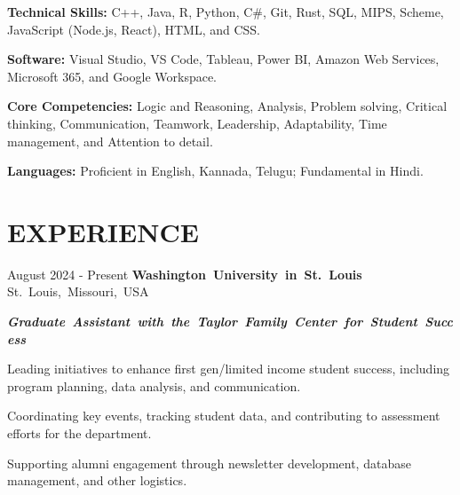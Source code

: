 \documentclass[10pt, letterpaper]{article}
\begin{document}
\begin{onecolentry}
    \textbf{Technical Skills:} C++, Java, R, Python, C\#, Git, Rust, SQL, MIPS, Scheme, JavaScript (Node.js, React), HTML, and CSS.
\end{onecolentry}
\vspace{\highlightSpacing}
\begin{onecolentry}
    \textbf{Software:} Visual Studio, VS Code, Tableau, Power BI, Amazon Web Services, Microsoft 365, and Google Workspace.
\end{onecolentry}
\vspace{\highlightSpacing}
\begin{onecolentry}
    \textbf{Core Competencies:} Logic and Reasoning, Analysis, Problem solving, Critical thinking, Communication, Teamwork, Leadership, Adaptability, Time management, and Attention to detail.
\end{onecolentry}
\vspace{\highlightSpacing}
\begin{onecolentry}
    \textbf{Languages:} Proficient in English, Kannada, Telugu; Fundamental in Hindi.
\end{onecolentry}

\section{EXPERIENCE}

\begin{twocolentry}{August 2024 - Present}
    \mbox{\textbf{Washington University in St. Louis}}
    \kern {}
    \AND
    \kern {}
    \mbox{St. Louis, Missouri, USA}
\end{twocolentry}

\vspace{\highlightSpacing}
\mbox{\textit{\textbf{Graduate Assistant with the Taylor Family Center for Student Success}}}
\begin{onecolentry}
    \begin{highlightsforbulletentries}
        \item Leading initiatives to enhance first gen/limited income student success, including program planning, data analysis, and communication.
        \item Coordinating key events, tracking student data, and contributing to assessment efforts for the department.
        \item Supporting alumni engagement through newsletter development, database management, and other logistics.
    \end{highlightsforbulletentries}
\end{onecolentry}
\end{document}
